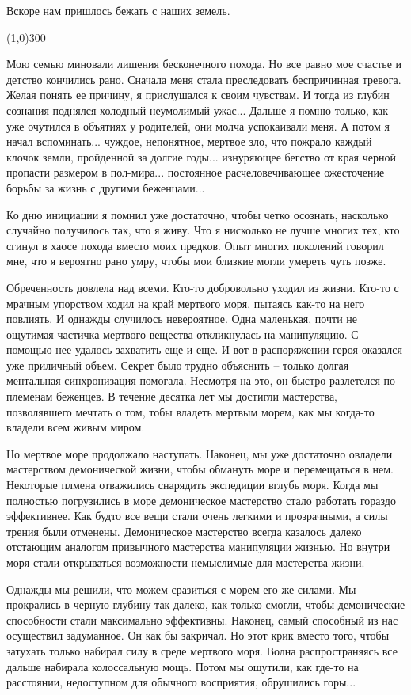 \documentclass[12pt,a4paper]{article}
\newcommand{\sep}{
	\begin{center}
		\line(1,0){300}
	\end{center}
}
\begin{document}
Вскоре нам пришлось бежать с наших земель.

\sep

Мою семью миновали лишения бесконечного похода. Но все равно мое счастье и детство кончились рано. Сначала меня стала преследовать беспричинная тревога. Желая понять ее причину, я прислушался к своим чувствам. И тогда из глубин сознания поднялся холодный неумолимый ужас... Дальше я помню только, как уже очутился в объятиях у родителей, они молча успокаивали меня. А потом я начал вспоминать... чуждое, непонятное, мертвое зло, что пожрало каждый клочок земли, пройденной за долгие годы... изнуряющее бегство от края черной пропасти размером в пол-мира... постоянное расчеловечивающее ожесточение борьбы за жизнь с другими беженцами...

Ко дню инициации я помнил уже достаточно, чтобы четко осознать, насколько случайно получилось так, что я живу. Что я нисколько не лучше многих тех, кто сгинул в хаосе похода вместо моих предков. Опыт многих поколений говорил мне, что я вероятно рано умру, чтобы мои близкие могли умереть чуть позже.

Обреченность довлела над всеми. Кто-то добровольно уходил из жизни. Кто-то с мрачным упорством ходил на край мертвого моря, пытаясь как-то на него повлиять. И однажды случилось невероятное. Одна маленькая, почти не ощутимая частичка мертвого вещества откликнулась на манипуляцию. С помощью нее удалось захватить еще и еще. И вот в распоряжении героя оказался уже приличный объем. Секрет было трудно объяснить -- только долгая ментальная синхронизация помогала. Несмотря на это, он быстро разлетелся по племенам беженцев. В течение десятка лет мы достигли мастерства, позволявшего мечтать о том, тобы владеть мертвым морем, как мы когда-то владели всем живым миром.

Но мертвое море продолжало наступать. Наконец, мы уже достаточно овладели мастерством демонической жизни, чтобы обмануть море и перемещаться в нем. Некоторые плмена отважились снарядить экспедиции вглубь моря. Когда мы полностью погрузились в море демоническое мастерство стало работать гораздо эффективнее. Как будто все вещи стали очень легкими и прозрачными, а силы трения были отменены. Демоническое мастерство всегда казалось далеко отстающим аналогом привычного мастерства манипуляции жизнью. Но внутри моря стали открываться возможности немыслимые для мастерства жизни.

Однажды мы решили, что можем сразиться с морем его же силами. Мы прокрались в черную глубину так далеко, как только смогли, чтобы демонические способности стали максимально эффективны. Наконец, самый способный из нас осуществил задуманное. Он как бы закричал. 
Но этот крик вместо того, чтобы затухать только набирал силу в среде мертвого моря. Волна распространяясь все дальше набирала колоссальную мощь. Потом мы ощутили, как где-то на расстоянии, недоступном для обычного восприятия, обрушились горы...
\end{document}

